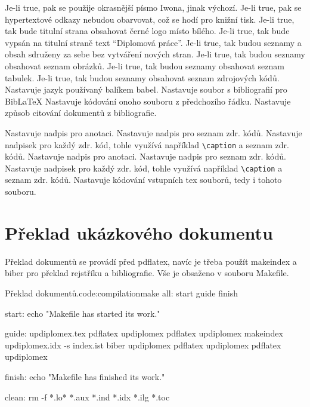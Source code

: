 \documentclass[a4paper,12pt]{article}
\begin{document}
\begin{optionlist}
Je-li true, pak se použije okrasnější písmo Iwona, jinak výchozí.
Je-li true, pak se hypertextové odkazy nebudou obarvovat, což se hodí pro knižní tisk.
Je-li true, tak bude titulní strana obsahovat černé logo místo bílého.
Je-li true, tak bude vypsán na titulní straně text \enquote{Diplomová práce}.
Je-li true, tak budou seznamy a obsah sdruženy za sebe bez vytváření nových stran. 
Je-li true, tak budou seznamy obsahovat seznam obrázků.
Je-li true, tak budou seznamy obsahovat seznam tabulek.
Je-li true, tak budou seznamy obsahovat seznam zdrojových kódů. 
Nastavuje jazyk používaný balíkem babel. 
Nastavuje soubor s bibliografií pro Bib\LaTeX  
{}
Nastavuje kódování onoho souboru z předchozího řádku. 
Nastavuje způsob citování dokumentů z bibliografie.

Nastavuje nadpis pro anotaci. 
Nastavuje nadpis pro seznam zdr. kódů.
Nastavuje nadpisek pro každý zdr. kód, tohle využívá například \verb|\caption| a seznam zdr. kódů. 
Nastavuje nadpis pro anotaci. 
Nastavuje nadpis pro seznam zdr. kódů.
Nastavuje nadpisek pro každý zdr. kód, tohle využívá například \verb|\caption| a seznam zdr. kódů. 
Nastavuje kódování vstupních tex souborů, tedy i tohoto souboru. 
\end{optionlist}

\section{Překlad ukázkového dokumentu}
Překlad dokumentů se provádí před pdflatex, navíc je třeba použít makeindex a biber pro překlad rejstříku a bibliografie. Vše je obsaženo v souboru Makefile.

\begin{upcode}{Překlad dokumentů.}{code:compilation}{make}
all: start guide finish

start:
	echo "Makefile has started its work."

guide:	updiplomex.tex
	pdflatex updiplomex
	pdflatex updiplomex
	makeindex updiplomex.idx -s index.ist
	biber updiplomex
	pdflatex updiplomex
	pdflatex updiplomex

finish:
	echo "Makefile has finished its work."

clean:
	rm -f *.lo* *.aux *.ind *.idx *.ilg *.toc
\end{upcode}
\end{document}
